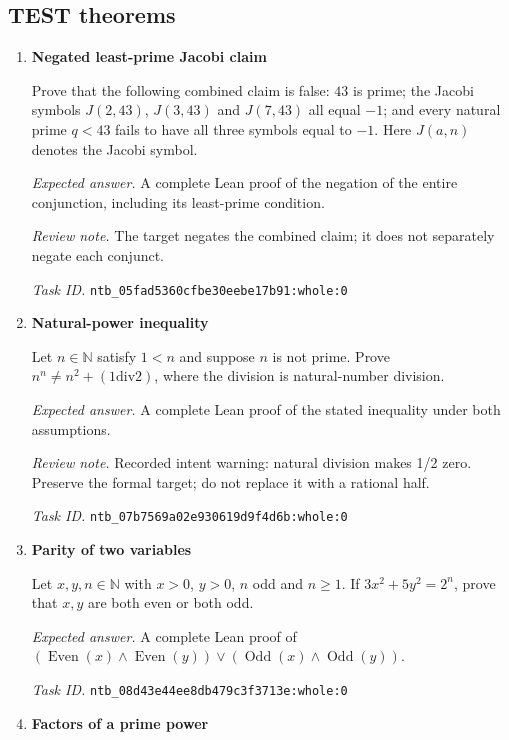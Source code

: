 \documentclass[11pt]{article}
\newcommand{\pth}[1]{\nolinkurl{#1}}
\begin{document}
\subsection{TEST theorems}
\begin{enumerate}[label={TEST \arabic*.},leftmargin=4.5em,itemsep=1em]
\item \textbf{Negated least-prime Jacobi claim}\label{qn:test:1}

Prove that the following combined claim is false: $43$ is prime; the Jacobi symbols $J(2,43)$, $J(3,43)$ and $J(7,43)$ all equal $-1$; and every natural prime $q<43$ fails to have all three symbols equal to $-1$. Here $J(a,n)$ denotes the Jacobi symbol.

\emph{Expected answer.} A complete Lean proof of the negation of the entire conjunction, including its least-prime condition.

\emph{Review note.} The target negates the combined claim; it does not separately negate each conjunct.

\emph{Task ID.} \pth{ntb_05fad5360cfbe30eebe17b91:whole:0}

\item \textbf{Natural-power inequality}\label{qn:test:2}

Let $n\in\mathbb{N}$ satisfy $1<n$ and suppose $n$ is not prime. Prove $n^n\ne n^2+(1\mathbin{\mathrm{div}}2)$, where the division is natural-number division.

\emph{Expected answer.} A complete Lean proof of the stated inequality under both assumptions.

\emph{Review note.} Recorded intent warning: natural division makes 1/2 zero. Preserve the formal target; do not replace it with a rational half.

\emph{Task ID.} \pth{ntb_07b7569a02e930619d9f4d6b:whole:0}

\item \textbf{Parity of two variables}\label{qn:test:3}

Let $x,y,n\in\mathbb{N}$ with $x>0$, $y>0$, $n$ odd and $n\ge1$. If $3x^2+5y^2=2^n$, prove that $x,y$ are both even or both odd.

\emph{Expected answer.} A complete Lean proof of $(\operatorname{Even}(x)\land\operatorname{Even}(y))\lor(\operatorname{Odd}(x)\land\operatorname{Odd}(y))$.

\emph{Task ID.} \pth{ntb_08d43e44ee8db479c3f3713e:whole:0}

\item \textbf{Factors of a prime power}\label{qn:test:4}


\end{enumerate}
\end{document}
